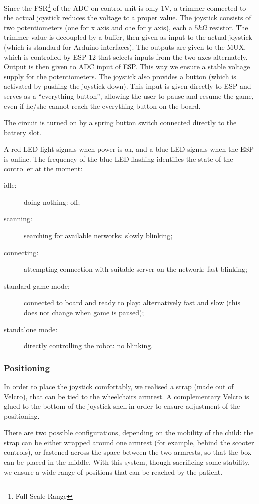 \documentclass[a4paper,twoside]{book}
\begin{document}
Since the FSR\footnote{Full Scale Range} of the ADC on control unit is only 1V, a trimmer connected to the actual joystick reduces the voltage to a proper value. The joystick consists of two potentiometers (one for x axis and one for y axis), each a $5k\Omega$ resistor.
The trimmer value is decoupled by a buffer, then given as input to the actual joystick (which is standard for Arduino interfaces). The outputs are given to the MUX, which is controlled by ESP-12 that selects inputs from the two axes alternately. Output is then given to ADC input of ESP.
This way we ensure a stable voltage supply for the potentiometers. 
The joystick also provides a button (which is activated by pushing the joystick down). This input is given directly to ESP and serves as a \textquotedblleft{}everything button\textquotedblright{}, allowing the user to pause and resume the game, even if he/she cannot reach the everything button on the board.

The circuit is turned on by a spring button switch connected directly to the battery slot.

\beforelist* A red LED light signals when power is on, and a blue LED signals when the ESP is online. The frequency of the blue LED flashing identifies the state of the controller at the moment:
\begin{description}
\item[idle:] doing nothing: off;
\item[scanning:] searching for available networks: slowly blinking;
\item[connecting:] attempting connection with suitable server on the network: fast blinking;
\item[standard game mode:] connected to board and ready to play: alternatively fast and slow (this does not change when game is paused);
\item[standalone mode:] directly controlling the robot: no blinking.
\end{description}
\afterlist*

\subsubsection{Positioning}

In order to place the joystick comfortably, we realised a strap (made out of Velcro), that can be tied to the wheelchairs armrest. A complementary Velcro is glued to the bottom of the joystick shell in order to ensure adjustment of the positioning. 

There are two possible configurations, depending on the mobility of the child: the strap can be either wrapped around one armrest (for example, behind the scooter controls), or fastened across the space between the two armrests, so that the box can be placed in the  middle. With this system, though sacrificing some stability, we ensure a wide range of positions that can be reached by the patient.
\end{document}
